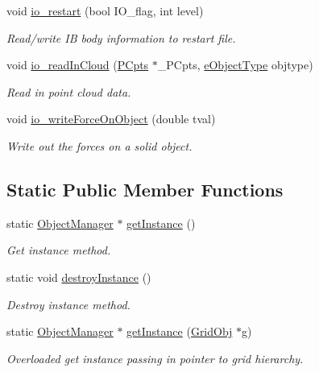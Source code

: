 \begin{DoxyCompactItemize}
void \hyperlink{class_object_manager_aaa1b7e2a3392c2a8d85606041b986b4d}{io\+\_\+restart} (bool I\+O\+\_\+flag, int level)
\begin{DoxyCompactList}\small\item\em Read/write IB body information to restart file. \end{DoxyCompactList}\item 
void \hyperlink{class_object_manager_a5c11d747c3df9e91d5fc2dac836d7b7e}{io\+\_\+read\+In\+Cloud} (\hyperlink{class_p_cpts}{P\+Cpts} $\ast$\+\_\+\+P\+Cpts, \hyperlink{_object_manager_8h_a7b78fa3db30dfb9c1efc82bf886fe184}{e\+Object\+Type} objtype)
\begin{DoxyCompactList}\small\item\em Read in point cloud data. \end{DoxyCompactList}\item 
void \hyperlink{class_object_manager_adf65260d81584613fa33f2e7658f1b36}{io\+\_\+write\+Force\+On\+Object} (double tval)
\begin{DoxyCompactList}\small\item\em Write out the forces on a solid object. \end{DoxyCompactList}\end{DoxyCompactItemize}
\subsection*{Static Public Member Functions}
\begin{DoxyCompactItemize}
\item 
static \hyperlink{class_object_manager}{Object\+Manager} $\ast$ \hyperlink{class_object_manager_acf7a2f12f034c76d9e3a5aa5837dddb5}{get\+Instance} ()
\begin{DoxyCompactList}\small\item\em Get instance method. \end{DoxyCompactList}\item 
static void \hyperlink{class_object_manager_a5945decc43eb5fdeaaad101fa7aa282f}{destroy\+Instance} ()
\begin{DoxyCompactList}\small\item\em Destroy instance method. \end{DoxyCompactList}\item 
static \hyperlink{class_object_manager}{Object\+Manager} $\ast$ \hyperlink{class_object_manager_a3c648f3d7388df47db0db9fcb4b8b618}{get\+Instance} (\hyperlink{class_grid_obj}{Grid\+Obj} $\ast$g)
\begin{DoxyCompactList}\small\item\em Overloaded get instance passing in pointer to grid hierarchy. \end{DoxyCompactList}\end{DoxyCompactItemize}
